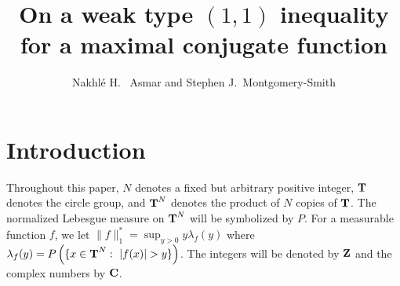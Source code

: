 \setlength\textwidth{6in}
\setlength\oddsidemargin{0.25in}
\topmargin -20mm
\footskip 12mm
\textheight 56pc
\def\Bbb#1{{\mathchoice{\mbox{\bf #1}}{\mbox{\bf #1}}%
{\mbox{$\scriptstyle \bf #1$}}{\mbox{$\scriptscriptstyle \bf #1$}}}}
\def\N{\Bbb N}
\def\R{\Bbb R}
\def\C{\Bbb C}
\def\Z{\Bbb Z}
\def\T{\Bbb T}
\def\Q{\Bbb Q}
\def\E{\Bbb E}
\def\O{{\cal O}}
\def\sgn{{\rm sgn}}
\def\H{{\cal H}_P}
\def\e{\epsilon}
\def\A{{\cal A}}
\def\cT{{\cal T}}
\def\cF{{\cal F}}




\title{On a weak type $(1,1)$ inequality for 
a maximal conjugate function}
\author{Nakhl\'e H. \ Asmar
 and 
 Stephen J.\ Montgomery-Smith
}
\date{}
\maketitle
\section{Introduction}
\newtheorem{maintheorem}{Theorem}[section]
\newtheorem{remarks}[maintheorem]{Remarks}

Throughout this paper, $N$ denotes a fixed but arbitrary 
positive integer, $\T$ denotes the
circle group, and $\T^N$
denotes the product of $N$ copies of $\T$.
The normalized Lebesgue measure on $\T^N$ will be 
symbolized by $P$.  For a measurable function
$f$, we let $\|f\|^*_1=\sup_{y>0}y \lambda_f(y)$
where
$\lambda_f (y)=P\left(\{x\in \T^N:\ |f(x)|>y\}
\right)$.  The integers will be denoted
by $\Z$ and the complex numbers by $\C$.

